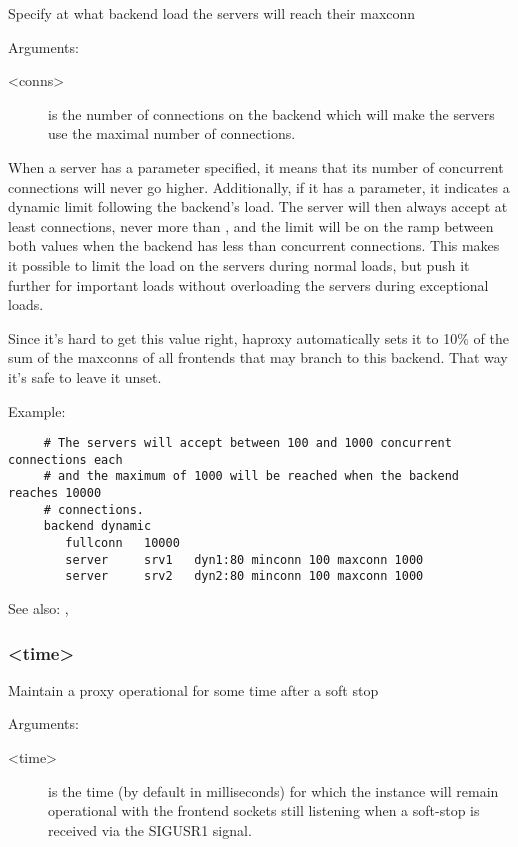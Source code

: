   Specify at what backend load the servers will reach their maxconn
  
  
  Arguments:
  \begin{description}
  \item[<conns>]
              is the number of connections on the backend which will make the
              servers use the maximal number of connections.
  \end{description}

  When a server has a  parameter specified, it means that its number
  of concurrent connections will never go higher. Additionally, if it has a
   parameter, it indicates a dynamic limit following the backend's
  load. The server will then always accept at least  connections,
  never more than , and the limit will be on the ramp between both
  values when the backend has less than  concurrent connections. This
  makes it possible to limit the load on the servers during normal loads, but
  push it further for important loads without overloading the servers during
  exceptional loads.

  Since it's hard to get this value right, haproxy automatically sets it to
  10\% of the sum of the maxconns of all frontends that may branch to this
  backend. That way it's safe to leave it unset.

  Example:
  \begin{verbatim}
     # The servers will accept between 100 and 1000 concurrent connections each
     # and the maximum of 1000 will be reached when the backend reaches 10000
     # connections.
     backend dynamic
        fullconn   10000
        server     srv1   dyn1:80 minconn 100 maxconn 1000
        server     srv2   dyn2:80 minconn 100 maxconn 1000
  \end{verbatim}


See also: , 

\subsubsection[grace]{ <time>}

  Maintain a proxy operational for some time after a soft stop
  
  
  Arguments:
  \begin{description}
  \item[<time>]
              is the time (by default in milliseconds) for which the instance
              will remain operational with the frontend sockets still listening
              when a soft-stop is received via the SIGUSR1 signal.
  \end{description}

